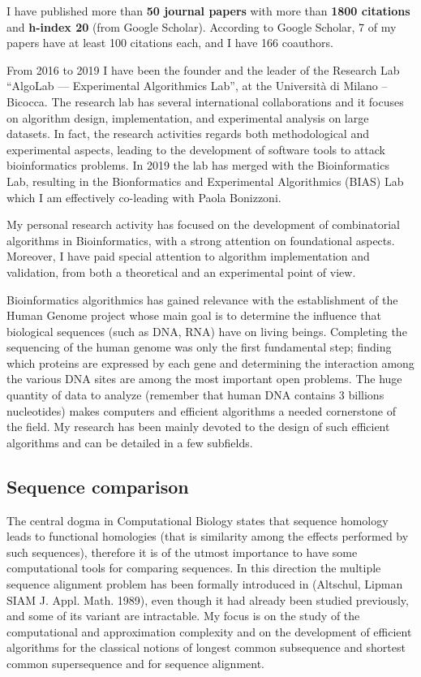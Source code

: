 \documentclass[11pt,a4paper,roman]{moderncv}
\begin{document}
I have published more than \textbf{50 journal papers} with more than \textbf{1800
citations} and \textbf{h-index 20} (from Google Scholar).
According to Google Scholar, 7 of my papers have at least 100 citations each, and I have 166 coauthors.

From 2016 to 2019 I have been the founder and the leader of the Research Lab
``AlgoLab --- Experimental Algorithmics Lab'', at the Università di Milano -- Bicocca.
The research lab has several international collaborations and it focuses on
algorithm design, implementation, and experimental analysis on large datasets.
In fact, the research activities regards both methodological and experimental
aspects, leading to the development of software tools to attack bioinformatics
problems.
In 2019 the lab has merged with the Bioinformatics Lab, resulting in the
Bionformatics and Experimental Algorithmics (BIAS) Lab which I am effectively
co-leading with Paola Bonizzoni.


My personal research activity has focused on the development of combinatorial
algorithms in Bioinformatics, with a strong attention on foundational aspects.
Moreover, I have paid special attention to algorithm implementation and validation, from both a theoretical and an experimental point of view.


Bioinformatics algorithmics has gained relevance with the establishment of the
Human Genome project whose main goal is to determine the influence that
biological sequences (such as DNA, RNA) have on living beings.
Completing the sequencing of the human genome was only the first
fundamental step; finding which proteins are expressed by each gene and
determining the interaction among the various DNA sites are among the
most important open problems. The huge quantity of data to
analyze (remember that human DNA contains 3 billions nucleotides) makes
computers and efficient algorithms a needed cornerstone of the field.
My research has been mainly devoted to the design of such
efficient algorithms and can be detailed in a few subfields.

\subsection{Sequence comparison}\label{sequence-comparison}

The central dogma in Computational Biology states that sequence homology
leads to functional homologies (that is similarity among the effects
performed by such sequences), therefore it is of the utmost importance
to have some computational tools for comparing sequences. In this
direction the multiple sequence alignment problem has been formally
introduced in (Altschul, Lipman SIAM J. Appl. Math. 1989), even though
it had already been studied previously, and some of its variant are
intractable. My focus is on the study of the computational and approximation
complexity and on the development of efficient algorithms for the classical
notions of longest common subsequence and shortest common supersequence and for
sequence alignment.
\end{document}
